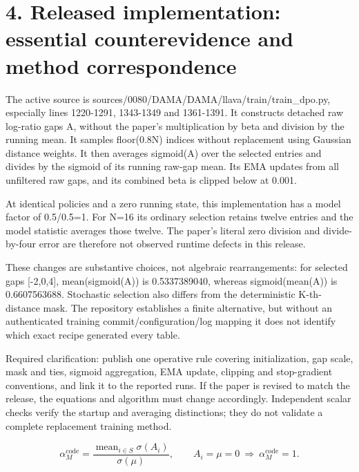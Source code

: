 \documentclass[10pt]{article}
\begin{document}
\section*{4. Released implementation: essential counterevidence and method correspondence}
The active source is sources/0080/DAMA/DAMA/llava/train/train\_dpo.py, especially lines 1220-1291, 1343-1349 and 1361-1391. It constructs detached raw log-ratio gaps A, without the paper’s multiplication by beta and division by the running mean. It samples floor(0.8N) indices without replacement using Gaussian distance weights. It then averages sigmoid(A) over the selected entries and divides by the sigmoid of its running raw-gap mean. Its EMA updates from all unfiltered raw gaps, and its combined beta is clipped below at 0.001.\par
At identical policies and a zero running state, this implementation has a model factor of 0.5/0.5=1. For N=16 its ordinary selection retains twelve entries and the model statistic averages those twelve. The paper’s literal zero division and divide-by-four error are therefore not observed runtime defects in this release.\par
These changes are substantive choices, not algebraic rearrangements: for selected gaps [-2,0,4], mean(sigmoid(A)) is 0.5337389040, whereas sigmoid(mean(A)) is 0.6607563688. Stochastic selection also differs from the deterministic K-th-distance mask. The repository establishes a finite alternative, but without an authenticated training commit/configuration/log mapping it does not identify which exact recipe generated every table.\par
Required clarification: publish one operative rule covering initialization, gap scale, mask and ties, sigmoid aggregation, EMA update, clipping and stop-gradient conventions, and link it to the reported runs. If the paper is revised to match the release, the equations and algorithm must change accordingly. Independent scalar checks verify the startup and averaging distinctions; they do not validate a complete replacement training method.\par
\[\alpha_M^{\mathrm{code}}=\frac{\operatorname{mean}_{i\in S}\sigma(A_i)}{\sigma(\mu)},\qquad A_i=\mu=0\ \Longrightarrow\ \alpha_M^{\mathrm{code}}=1.\]\par
\end{document}
